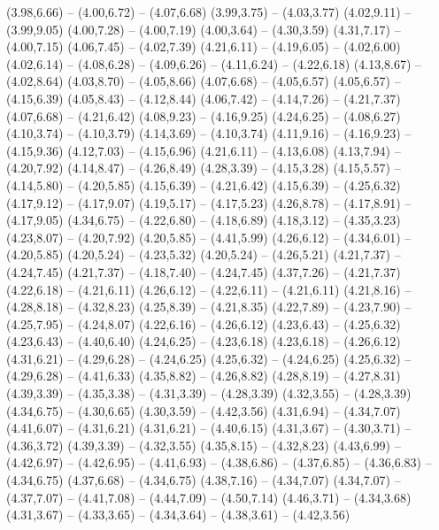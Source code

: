 {  (3.98,6.66) -- (4.00,6.72) -- (4.07,6.68)
  (3.99,3.75) -- (4.03,3.77)
  (4.02,9.11) -- (3.99,9.05)
  (4.00,7.28) -- (4.00,7.19)
  (4.00,3.64) -- (4.30,3.59)
  (4.31,7.17) -- (4.00,7.15)
  (4.06,7.45) -- (4.02,7.39)
  (4.21,6.11) -- (4.19,6.05) -- (4.02,6.00)
  (4.02,6.14) -- (4.08,6.28) -- (4.09,6.26) -- (4.11,6.24) -- (4.22,6.18)
  (4.13,8.67) -- (4.02,8.64)
  (4.03,8.70) -- (4.05,8.66)
  (4.07,6.68) -- (4.05,6.57)
  (4.05,6.57) -- (4.15,6.39)
  (4.05,8.43) -- (4.12,8.44)
  (4.06,7.42) -- (4.14,7.26) -- (4.21,7.37)
  (4.07,6.68) -- (4.21,6.42)
  (4.08,9.23) -- (4.16,9.25)
  (4.24,6.25) -- (4.08,6.27)
  (4.10,3.74) -- (4.10,3.79)
  (4.14,3.69) -- (4.10,3.74)
  (4.11,9.16) -- (4.16,9.23) -- (4.15,9.36)
  (4.12,7.03) -- (4.15,6.96)
  (4.21,6.11) -- (4.13,6.08)
  (4.13,7.94) -- (4.20,7.92)
  (4.14,8.47) -- (4.26,8.49)
  (4.28,3.39) -- (4.15,3.28)
  (4.15,5.57) -- (4.14,5.80) -- (4.20,5.85)
  (4.15,6.39) -- (4.21,6.42)
  (4.15,6.39) -- (4.25,6.32)
  (4.17,9.12) -- (4.17,9.07)
  (4.19,5.17) -- (4.17,5.23)
  (4.26,8.78) -- (4.17,8.91) -- (4.17,9.05)
  (4.34,6.75) -- (4.22,6.80) -- (4.18,6.89)
  (4.18,3.12) -- (4.35,3.23)
  (4.23,8.07) -- (4.20,7.92)
  (4.20,5.85) -- (4.41,5.99)
  (4.26,6.12) -- (4.34,6.01) -- (4.20,5.85)
  (4.20,5.24) -- (4.23,5.32)
  (4.20,5.24) -- (4.26,5.21)
  (4.21,7.37) -- (4.24,7.45)
  (4.21,7.37) -- (4.18,7.40) -- (4.24,7.45)
  (4.37,7.26) -- (4.21,7.37)
  (4.22,6.18) -- (4.21,6.11)
  (4.26,6.12) -- (4.22,6.11) -- (4.21,6.11)
  (4.21,8.16) -- (4.28,8.18) -- (4.32,8.23)
  (4.25,8.39) -- (4.21,8.35)
  (4.22,7.89) -- (4.23,7.90) -- (4.25,7.95) -- (4.24,8.07)
  (4.22,6.16) -- (4.26,6.12)
  (4.23,6.43) -- (4.25,6.32)
  (4.23,6.43) -- (4.40,6.40)
  (4.24,6.25) -- (4.23,6.18)
  (4.23,6.18) -- (4.26,6.12)
  (4.31,6.21) -- (4.29,6.28) -- (4.24,6.25)
  (4.25,6.32) -- (4.24,6.25)
  (4.25,6.32) -- (4.29,6.28) -- (4.41,6.33)
  (4.35,8.82) -- (4.26,8.82)
  (4.28,8.19) -- (4.27,8.31)
  (4.39,3.39) -- (4.35,3.38) -- (4.31,3.39) -- (4.28,3.39)
  (4.32,3.55) -- (4.28,3.39)
  (4.34,6.75) -- (4.30,6.65)
  (4.30,3.59) -- (4.42,3.56)
  (4.31,6.94) -- (4.34,7.07)
  (4.41,6.07) -- (4.31,6.21)
  (4.31,6.21) -- (4.40,6.15)
  (4.31,3.67) -- (4.30,3.71) -- (4.36,3.72)
  (4.39,3.39) -- (4.32,3.55)
  (4.35,8.15) -- (4.32,8.23)
  (4.43,6.99) -- (4.42,6.97) -- (4.42,6.95) -- (4.41,6.93) -- (4.38,6.86) -- (4.37,6.85) -- (4.36,6.83) -- (4.34,6.75)
  (4.37,6.68) -- (4.34,6.75)
  (4.38,7.16) -- (4.34,7.07)
  (4.34,7.07) -- (4.37,7.07) -- (4.41,7.08) -- (4.44,7.09) -- (4.50,7.14)
  (4.46,3.71) -- (4.34,3.68)
  (4.31,3.67) -- (4.33,3.65) -- (4.34,3.64) -- (4.38,3.61) -- (4.42,3.56)
}
